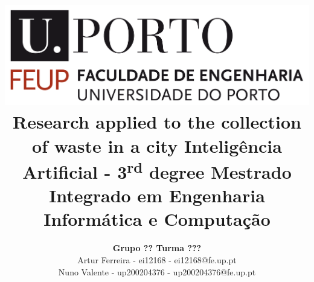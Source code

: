 \documentclass[a4paper]{article}
\begin{document}


\title{\includegraphics[scale=0.15]{feup_logo.png}
\linebreak\linebreak\linebreak\linebreak\linebreak
\Large\textbf{Research applied to the collection of waste in a city }
\linebreak\linebreak\linebreak\linebreak
\Large{Inteligência Artificial - 3\textsuperscript{rd} degree}
\linebreak
\Large{Mestrado Integrado em Engenharia Informática e Computação}\linebreak\linebreak\linebreak\linebreak
}
\author{\textbf{Grupo ?? Turma ???}\\
Artur Ferreira - ei12168 - ei12168@fe.up.pt\\
Nuno Valente - up200204376 - up200204376@fe.up.pt\\
\linebreak\linebreak \\
\linebreak\linebreak\linebreak
\linebreak\linebreak\vspace{1cm}}

\maketitle

\thispagestyle{empty}
\newpage
\tableofcontents 
\newpage
\end{document}
